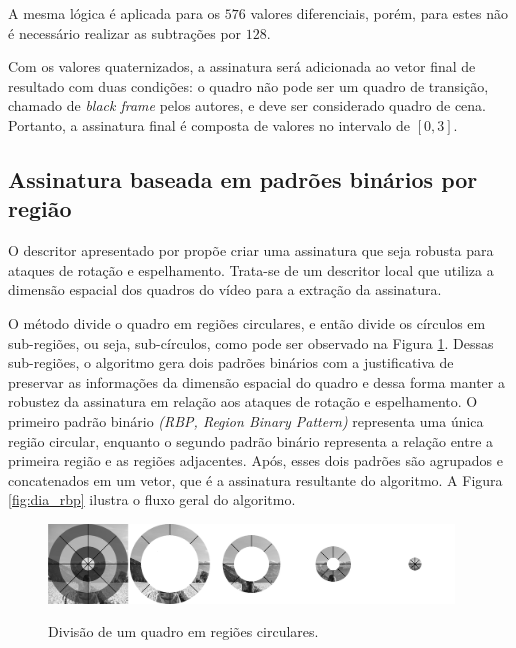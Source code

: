 A mesma lógica é aplicada para os $576$ valores diferenciais, porém, para estes não é necessário realizar as subtrações por $128$.

Com os valores quaternizados, a assinatura será adicionada ao vetor final de resultado com duas condições: o quadro não pode ser um quadro de transição, chamado de \textit{black frame} pelos autores, e deve ser considerado quadro de cena. Portanto, a assinatura final é composta de valores no intervalo de $\left[0,3\right]$.

%
\subsection{Assinatura baseada em padrões binários por região}


O descritor apresentado por  propõe criar uma assinatura que seja robusta para ataques de rotação e espelhamento. Trata-se de um descritor local que utiliza a dimensão espacial dos quadros do vídeo para a extração da assinatura. 

O método divide o quadro em regiões circulares, e então divide os círculos em sub-regiões, ou seja, sub-círculos, como pode ser observado na Figura \ref{fig:aneis_rbp}. Dessas sub-regiões, o algoritmo gera dois padrões binários com a justificativa de preservar as informações da dimensão espacial do quadro e dessa forma manter a robustez da assinatura em relação aos ataques de rotação e espelhamento. O  primeiro padrão binário  \textit{(RBP, Region Binary Pattern)} representa uma única região circular, enquanto o segundo padrão binário representa a relação entre a primeira região e as regiões adjacentes. Após, esses dois padrões são agrupados e concatenados em um vetor, que é a assinatura resultante do algoritmo. A Figura \ref{fig:dia_rbp} ilustra o fluxo geral do algoritmo.

 \begin{figure}[h]
      \centering
      \caption{Divisão de um quadro em regiões circulares.}
      \includegraphics[width=0.96\textwidth]{dados/figuras/brp_aneis}
       	\label{fig:aneis_rbp}
    \end{figure} 

